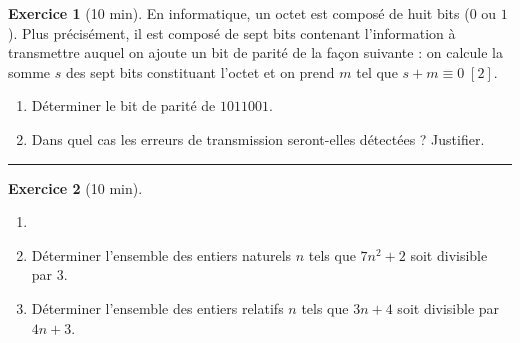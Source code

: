 \documentclass{exam}
\theoremstyle{definition}
\newtheorem{exercice}{Exercice}
\begin{document}
    \begin{exercice}[10 min]
        En informatique, un octet est composé de huit bits ($0$ ou $1$). Plus précisément, il est composé de sept bits contenant l’information à transmettre auquel on ajoute un bit de parité de la façon suivante : on calcule la somme $s$ des sept bits constituant l’octet et on prend $m$ tel que $s + m \equiv 0 \; [2]$.
        \begin{enumerate}
            \item Déterminer le bit de parité de $1011001$.
            \item Dans quel cas les erreurs de transmission seront-elles détectées ? Justifier.
        \end{enumerate}
    \end{exercice}

    \vspace{1em}

    \hrule

    \vspace{1em}
    
    \setcounter{exercice}{0}




    
    \begin{exercice}[10 min]
        \begin{enumerate}
            \item[]
            \item Déterminer l’ensemble des entiers naturels $n$ tels que $7n^2 + 2$ soit divisible par $3$.
            \item Déterminer l’ensemble des entiers relatifs $n$ tels que $3n + 4$ soit divisible par $4n + 3$.
        \end{enumerate}
    \end{exercice}
    
\end{document}
